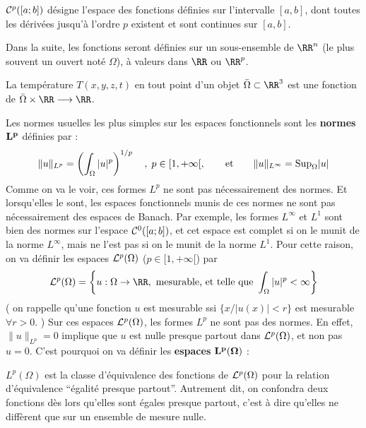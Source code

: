 \begin{example}
  ${\cal C}^p([a;b])$ d\'esigne l'espace des fonctions d\'efinies sur
  l'intervalle $[a,b]$, dont toutes les d\'eriv\'ees jusqu'\`a l'ordre $p$
  existent et sont continues sur $[a,b]$.
\end{example}



%
Dans la suite, les fonctions seront d\'efinies sur un sous-ensemble de $\RR^n$ (le plus souvent un ouvert not\'e $\Omega$), \`a valeurs dans $\RR$ ou $\RR^p$.
%

\begin{example}
  La temp\'erature $T(x,y,z,t)$ en tout point d'un objet $\bar{\Omega}\subset \RR^3$ est une fonction de $ \bar{\Omega} \times \RR \longrightarrow \RR$.
\end{example}


%

%
Les normes usuelles les plus simples sur les espaces fonctionnels sont les
{\bf normes} $\bf L^p$ d\'efinies par :
$$
\| u \|_{L^p} = \left ( \int_{\Omega } |u|^p \right) ^{1/p} \quad ,\; p\in [1,+ \infty[ ,
\qquad
\hbox{et}\qquad
\| u \|_{L^\infty} = {\hbox{Sup}}_{\Omega } |u|
$$
%
%
Comme on va le voir, ces formes $L^p$ ne sont pas n\'ecessairement des
normes. Et lorsqu'elles le sont, les espaces fonctionnels munis de ces normes
ne sont pas n\'ecessairement des espaces de Banach. Par exemple, les formes
$L^\infty$ et $L^1$ sont bien des normes sur l'espace ${\cal C}^0([a;b])$, et
cet espace est complet si on le munit de la norme $L^\infty$, mais ne l'est
pas si on le munit de la norme $L^1$.
%
Pour cette raison, on va d\'efinir les espaces ${\cal L}^p(\Omega)$ ($p\in [1,+ \infty[$) par
$$
{\cal L}^p(\Omega) = \left\{  u : \Omega \rightarrow \RR, \hbox{ mesurable, et telle que } \int_\Omega |u|^p<\infty  \right\}
$$
%
( on rappelle qu'une fonction $u$ est mesurable ssi $\{ x /  |u(x)|<r \}$ est mesurable $\forall r>0$. )
%
Sur ces espaces ${\cal L}^p(\Omega)$, les formes $L^p$ ne sont pas des normes. En effet, $\| u \|_{L^p} = 0$ implique que $u$ est nulle presque partout dans ${\cal L}^p(\Omega)$, et non pas $u=0$. C'est pourquoi on va d\'efinir les {\bf espaces} $\bf L^p(\Omega)$ :
%
\begin{definition}
  $L^p(\Omega)$ est la classe d'\'equivalence des fonctions de ${\cal
  L}^p(\Omega)$ pour la relation d'\'equivalence ``\'egalit\'e presque
  partout''. Autrement dit, on confondra deux fonctions d\`es lors qu'elles
  sont \'egales presque partout, c'est \`a dire qu'elles ne diff\`erent que
  sur un ensemble de mesure nulle.\label{def:9}
\end{definition}

